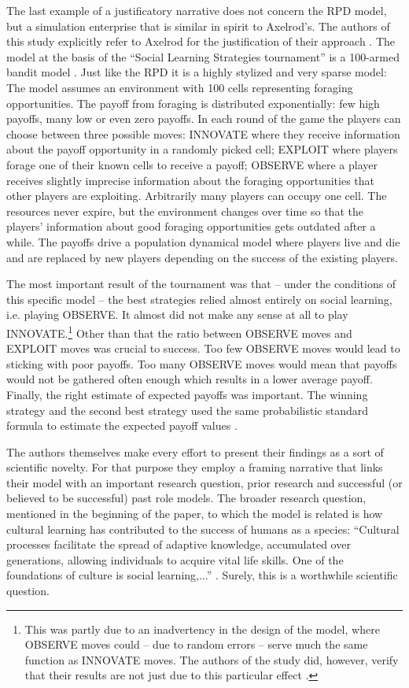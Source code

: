 \documentclass[graybox, English]{svmult}
\begin{document}
The last example of a justificatory narrative does not concern the RPD
model, but a simulation enterprise that is similar in spirit to
Axelrod's. The authors of this study explicitly refer to Axelrod for
the justification of their approach
\citep[208-209]{rendell-et-al:2010a}. The model at the basis of the
``Social Learning Strategies tournament'' is a 100-armed bandit model
\citep[30ff.]{rendell-et-al:2010b}. Just like the RPD it is a highly
stylized and very sparse model: The model assumes an environment with
100 cells representing foraging opportunities. The payoff from foraging
is distributed exponentially: few high payoffs, many low or even zero
payoffs. In each round of the game the players can choose between
three possible moves: INNOVATE where they receive information about
the payoff opportunity in a randomly picked cell; EXPLOIT where
players forage one of their known cells to receive a payoff; OBSERVE
where a player receives slightly imprecise information about the
foraging opportunities that other players are exploiting. Arbitrarily
many players can occupy one cell. The resources never expire, but the
environment changes over time so that the players’ information about
good foraging opportunities gets outdated after a while. The payoffs
drive a population dynamical model where players live and die and are
replaced by new players depending on the success of the existing
players.

The most important result of the tournament was that – under the
conditions of this specific model – the best strategies relied almost
entirely on social learning, i.e. playing OBSERVE. It almost did not
make any sense at all to play INNOVATE.\footnote{This was partly due
  to an inadvertency in the design of the model, where OBSERVE moves
  could -- due to random errors -- serve much the same function as
  INNOVATE moves. The authors of the study did, however, verify that
  their results are not just due to this particular effect
  \cite[21f.]{rendell-et-al:2010b}.} Other than that the ratio between
OBSERVE moves and EXPLOIT moves was crucial to success. Too few
OBSERVE moves would lead to sticking with poor payoffs. Too many
OBSERVE moves would mean that payoffs would not be gathered often
enough which results in a lower average payoff. Finally, the right
estimate of expected payoffs was important. The winning strategy and
the second best strategy used the same probabilistic standard formula
to estimate the expected payoff values
\citep[211]{rendell-et-al:2010a}.

 The authors themselves make every effort to present their
findings as a sort of scientific novelty. For that purpose they employ
a framing narrative that links their model with an important research
question, prior research and successful (or believed to be successful)
past role models. The broader research question, mentioned in the
beginning of the paper, to which the model is related is how cultural
learning has contributed to the success of humans as a species:
“Cultural processes facilitate the spread of adaptive knowledge,
accumulated over generations, allowing individuals to acquire vital
life skills. One of the foundations of culture is social learning,...”
\citep[208]{rendell-et-al:2010a}. Surely, this is a worthwhile
scientific question. 
\end{document}

